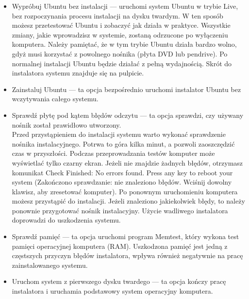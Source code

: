 \begin{itemize}
\item \textcolor{ubuntu_orange}{Wypróbuj Ubuntu bez instalacji} --- uruchomi system Ubuntu w trybie Live, bez rozpoczynania procesu instalacji na dysku twardym. W ten sposób możesz przetestować Ubuntu i zobaczyć jak działa w praktyce. Wszystkie zmiany, jakie wprowadzisz w systemie, zostaną odrzucone po wyłączeniu komputera. Należy pamiętać, że w tym trybie Ubuntu działa bardzo wolno, gdyż musi korzystać z powolnego nośnika (płyta DVD lub pendrive). Po normalnej instalacji Ubuntu będzie działać z pełną wydajnością. Skrót do instalatora systemu znajduje się na pulpicie.
\item \textcolor{ubuntu_orange}{Zainstaluj Ubuntu} --- ta opcja bezpośrednio uruchomi instalator Ubuntu bez wczytywania całego systemu.
\item \textcolor{ubuntu_orange}{Sprawdź płytę pod kątem błędów odczytu} --- ta opcja sprawdzi, czy używany nośnik został prawidłowo utworzony.\\
Przed przystąpieniem do instalacji systemu warto wykonać sprawdzenie nośnika instalacyjnego. Potrwa to góra kilka minut, a pozwoli zaoszczędzić czas w przyszłości. Podczas przeprowadzania testów komputer może wyświetlać tylko czarny ekran. Jeżeli nie znajdzie żadnych błędów, otrzymasz komunikat \textcolor{ubuntu_orange}{Check Finished: No errors found. Press any key to reboot your system (Zakończono sprawdzanie: nie znaleziono błędów. Wciśnij dowolny klawisz, aby zresetować komputer)}. Po ponownym uruchomieniu komputera możesz przystąpić do instalacji. Jeżeli znaleziono jakiekolwiek błędy, to należy ponownie przygotować nośnik instalacyjny. Użycie wadliwego instalatora doprowadzi do uszkodzenia systemu. 
\item \textcolor{ubuntu_orange}{Sprawdź pamięć} --- ta opcja uruchomi program Memtest, który wykona test pamięci operacyjnej komputera (RAM). Uszkodzona pamięć jest jedną z częstszych przyczyn błędów instalatora, wpływa również negatywnie na pracę zainstalowanego systemu.
\item \textcolor{ubuntu_orange}{Uruchom system z pierwszego dysku twardego} --- ta opcja kończy pracę instalatora i uruchamia podstawowy system operacyjny komputera.
\end{itemize}

